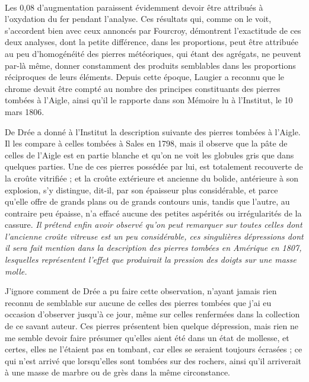 \documentclass[a4paper, 12pt, oneside, french]{article}
\begin{document}
\paragraph{}
Les 0,08 d'augmentation paraissent évidemment devoir être attribués à l'oxydation du fer pendant l'analyse. Ces résultats qui, comme on le voit, s'accordent bien avec ceux annoncés par Fourcroy, démontrent l'exactitude de ces deux analyses, dont la petite différence, dans les proportions, peut être attribuée au peu d'homogénéité des pierres météoriques, qui étant des agrégats, ne peuvent par-là même, donner constamment des produits semblables dans les proportions réciproques de leurs éléments. Depuis cette époque, Laugier a reconnu que le chrome devait être compté au nombre des principes constituants des pierres tombées à l'Aigle, ainsi qu'il le rapporte dans son Mémoire lu à l'Institut, le 10 mars 1806.

De Drée a donné à l'Institut la description suivante des pierres tombées à l'Aigle. Il les compare à celles tombées à Sales en 1798, mais il observe que la pâte de celles de l'Aigle est en partie blanche et qu'on ne voit les globules gris que dans quelques parties. Une de ces pierres possédée par lui, est totalement recouverte de la croûte vitrifiée ; et la croûte extérieure et ancienne du bolide, antérieure à son explosion, s'y distingue, dit-il, par son épaisseur plus considérable, et parce qu'elle offre de grands plans ou de grands contours unis, tandis que l'autre, au contraire peu épaisse, n'a effacé aucune des petites aspérités ou irrégularités de la cassure. \emph{Il prétend enfin avoir observé qu'on peut remarquer sur toutes celles dont l'ancienne croûte vitreuse est un peu considérable, ces singulières dépressions dont il sera fait mention dans la description des pierres tombées en Amérique en 1807, lesquelles représentent l'effet que produirait la pression des doigts sur une masse molle.}

J'ignore comment de Drée a pu faire cette observation, n'ayant jamais rien reconnu de semblable sur aucune de celles des pierres tombées que j'ai eu occasion d'observer jusqu'à ce jour, même sur celles renfermées dans la collection de ce savant auteur. Ces pierres présentent bien quelque dépression, mais rien ne me semble devoir faire présumer qu'elles aient été dans un état de mollesse, et certes, elles ne l'étaient pas en tombant, car elles se seraient toujours écrasées ; ce qui n'est arrivé que lorsqu'elles sont tombées sur des rochers, ainsi qu'il arriverait à une masse de marbre ou de grès dans la même circonstance.
\end{document}
